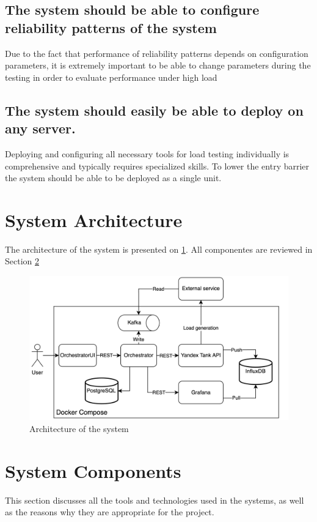 \subsection{The system should be able to configure reliability patterns of the system}\label{subsec:req-configure}
Due to the fact that performance of reliability patterns depends on configuration parameters, it is extremely important to be able to change parameters during the testing in order to evaluate performance under high load

\subsection{The system should easily be able to deploy on any server.}\label{subsec:req-deploy}
Deploying and configuring all necessary tools for load testing individually is comprehensive and typically requires specialized skills. To lower the entry barrier the system should be able to be deployed as a single unit.


\section{System Architecture}\label{sec:system-architecture}
The architecture of the system is presented on \ref{fig:architecture}. All componentes are reviewed in Section \ref{sec:system-components}

\begin{figure}[t]
    \centering
    \includegraphics[height=\textheight,width=\textwidth,keepaspectratio]{architecture.png}
    \caption{Architecture of the system}
    \label{fig:architecture}
\end{figure}

\section{System Components}\label{sec:system-components}
This section discusses all the tools and technologies used in the systems, as well as the reasons why they are appropriate for the project.
